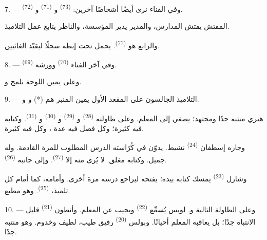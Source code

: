 7. --- وفي الفناء نرى أيضًا أشخاصًا آخرين: 
\textsuperscript{(73)} و \textsuperscript{(71)} و
\textsuperscript{(72)}.

المفتش يفتش المدارس، والمدير يدير المؤسسة، والناظر يتابع عمل التلاميذ.

والرابع هو  \textsuperscript{(77)}. يحمل تحت إبطه سجلًا ليقيّد
الغائبين.

8. --- وفي آخر الفناء  \textsuperscript{(70)} وورشة
 \textsuperscript{(69)}.

وعلى يمين اللوحة نلمح   و.


\VUsaut{2.4mm}

\VUsaut{3.0mm}

9. --- التلاميذ الجالسون على المقعد الأول يمين المنبر هم 
(*) و و.

هنري منتبه جدًا ومجتهد؛ يصغي إلى المعلم. وعلى طاولته 
\textsuperscript{(28)} و \textsuperscript{(29)} و
\textsuperscript{(30)} و \textsuperscript{(31)}. وكتابه فيه
 كثيرة؛ وكل فصل فيه عدة ، وكل  فيه
 كثيرة.

وجاره إسطفان \textsuperscript{(24)} نشيط. يدوّن في كُرّاسته الدرس المطلوب للمرة
القادمة. وله  جميل. وكتابه مغلق. لا يُرى منه إلا 
\textsuperscript{(27)}. وإلى جانبه  \textsuperscript{(26)}.

وشارل \textsuperscript{(23)} يمسك كتابه بيده؛ يفتحه ليراجع درسه مرة أخرى. وأمامه،
كما أمام كل تلميذ،  \textsuperscript{(25)}. وهو مطيع.

10. --- وعلى الطاولة التالية  و. لويس
يُسمِّع  \textsuperscript{(22)} ويجيب عن  المعلم.
وأنطون \textsuperscript{(21)} قليل الانتباه جدًا؛ بل يعاقبه المعلم أحيانًا. وبولس
\textsuperscript{(20)} رفيق طيب، لطيف وخدوم. وهو منتبه جدًا.

